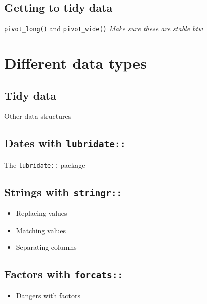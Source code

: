 \documentclass[]{book}
\providecommand{\tightlist}{%
  \setlength{\itemsep}{0pt}\setlength{\parskip}{0pt}}
\begin{document}
\hypertarget{getting-to-tidy-data}{%
\section{Getting to tidy data}\label{getting-to-tidy-data}}

\texttt{pivot\_long()} and \texttt{pivot\_wide()}
\emph{Make sure these are stable btw}

\hypertarget{different-data-types}{%
\chapter{Different data types}\label{different-data-types}}

\hypertarget{tidy-data}{%
\section{Tidy data}\label{tidy-data}}

Other data structures

\hypertarget{dates-with-lubridate}{%
\section{\texorpdfstring{Dates with \texttt{lubridate::}}{Dates with lubridate::}}\label{dates-with-lubridate}}

The \texttt{lubridate::} package

\hypertarget{strings-with-stringr}{%
\section{\texorpdfstring{Strings with \texttt{stringr::}}{Strings with stringr::}}\label{strings-with-stringr}}

\begin{itemize}
\tightlist
\item
  Replacing values
\item
  Matching values
\item
  Separating columns
\end{itemize}

\hypertarget{factors-with-forcats}{%
\section{\texorpdfstring{Factors with \texttt{forcats::}}{Factors with forcats::}}\label{factors-with-forcats}}

\begin{itemize}
\tightlist
\item
  Dangers with factors
\end{itemize}
\end{document}
